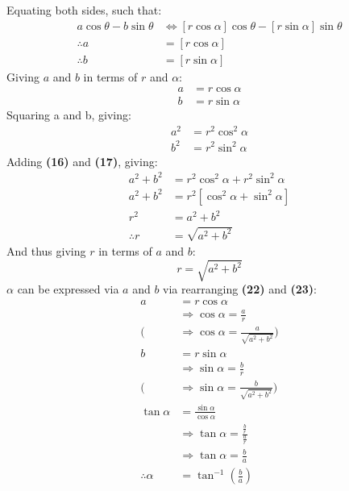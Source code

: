 \documentclass{article}
\begin{document}
        Equating both sides, such that:
        \begin{align*}
        a\cos{\theta} - b\sin{\theta} &\Leftrightarrow [r\cos\alpha]\cos{\theta} - [r\sin\alpha]\sin{\theta} \\
        \therefore a &= [r\cos\alpha] \\
        \therefore b &= [r\sin\alpha]
        \end{align*}
        Giving $a$ and $b$ in terms of $r$ and $\alpha$:
        \begin{align}
        a &= r\cos\alpha \\
        b &= r\sin\alpha
        \end{align}
        Squaring a and b, giving:
        \begin{align}
        a^2 &= r^2\cos^2{\alpha} \\
        b^2 &= r^2\sin^2{\alpha}
        \end{align}
        Adding \textbf{(16)} and \textbf{(17)}, giving:
        \begin{align*}
        a^2 + b^2 &= r^2\cos^2{\alpha} + r^2\sin^2{\alpha} \\
        a^2 + b^2 &= r^2[\cos^2{\alpha} + \sin^2{\alpha}] \\
        r^2 &= a^2 + b^2 \\
        \therefore r &= \sqrt{a^2 + b^2}
        \end{align*}
        And thus giving $r$ in terms of $a$ and $b$:
        \begin{equation}
        r = \sqrt{a^2 + b^2}
        \end{equation}
        $\alpha$ can be expressed via $a$ and $b$ via rearranging \textbf{(22)} and \textbf{(23)}:
        \begin{align*}
        a &= r\cos\alpha \\
        &\Rightarrow \cos\alpha = \frac{a}{r} \\
        (&\Rightarrow \cos\alpha = \frac{a}{\sqrt{a^2 + b^2}}) \\
        b &= r\sin\alpha \\
        &\Rightarrow \sin\alpha = \frac{b}{r} \\
        (&\Rightarrow \sin\alpha = \frac{b}{\sqrt{a^2 + b^2}}) \\
        \tan\alpha &= \frac{\sin\alpha}{\cos\alpha} \\
        &\Rightarrow \tan\alpha = \frac{\frac{b}{r}}{\frac{a}{r}} \\
        &\Rightarrow \tan\alpha = \frac{b}{a} \\
        \therefore \alpha &= \tan^{-1}{\left( \frac{b}{a}\right) }
        \end{align*}
\end{document}
